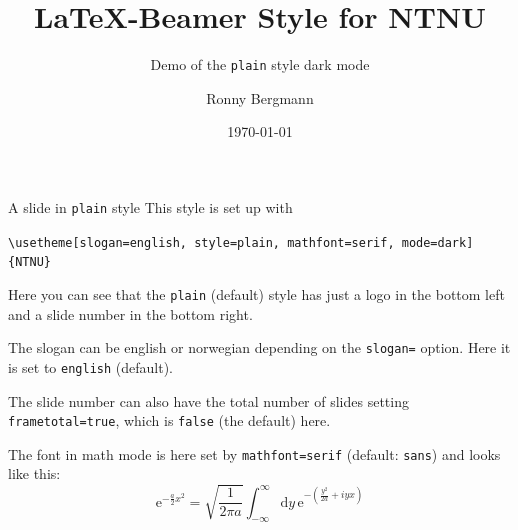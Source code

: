 \documentclass[aspectratio=169]{beamer}
\title{\LaTeX{}-Beamer Style for NTNU}
\subtitle{Demo of the  \texttt{plain} style dark mode}
\author{Ronny Bergmann}
\date{\today}
\begin{document}
	\maketitle
    \begin{frame}[fragile]{A slide in \texttt{plain} style}
        This style is set up with

        \lstinline!\usetheme[slogan=english, style=plain, mathfont=serif, mode=dark]{NTNU}!

        Here you can see that the \texttt{plain} (default) style has just a logo in the bottom left and a slide number in the bottom right.

        The slogan can be english or norwegian depending on the \lstinline!slogan=! option. Here it is set to \lstinline!english! (default).

        The slide number can also have the total number of slides setting \lstinline!frametotal=true!, which is \lstinline!false! (the default) here.

        The font in math mode is here set by \lstinline!mathfont=serif! (default: \lstinline!sans!) and looks like this: \[\mathrm{e}^{-\frac{a}{2}x^2} = \sqrt{\frac{1}{2\pi a}} \int_{-\infty}^\infty\mathrm{d}y\, \mathrm{e}^{-\left(\frac{y^2}{2a} +iy x\right)}\]
    \end{frame}
\end{document}
